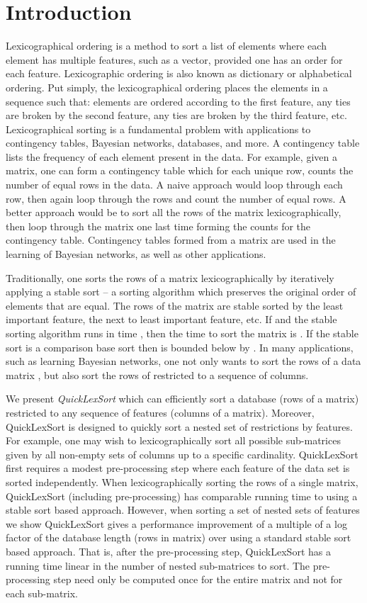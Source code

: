 \documentclass[a4paper,10pt,reqno]{amsart}
\theoremstyle{definition}
\begin{document}
\section{Introduction}
\label{sec:introduction}
Lexicographical ordering is a method to sort a list of elements where each
element has multiple features, such as a vector, provided one has an order for
each feature. Lexicographic ordering is also known as dictionary or
alphabetical ordering. Put simply, the lexicographical ordering places the
elements in a sequence such that: elements are ordered according to the first
feature, any ties are broken by the second feature, any ties are broken by the
third feature, etc. Lexicographical sorting is a fundamental problem with
applications to contingency tables, Bayesian networks,
databases\cite{poess2003data,lemire2010sorting}, and more. A contingency table
lists the frequency of each element present in the data. For example, given a
matrix, one can form a contingency table which for each unique row, counts the
number of equal rows in the data. A naive approach would loop through each row,
then again loop through the rows and count the number of equal rows. A better
approach would be to sort all the rows of the matrix lexicographically, then
loop through the matrix one last time forming the counts for the contingency
table. Contingency tables formed from a matrix are used in the learning of
Bayesian networks, as well as other applications.

Traditionally, one sorts the rows of a matrix lexicographically by iteratively
applying a stable sort -- a sorting algorithm which preserves the original
order of elements that are equal. The rows of the matrix  are stable sorted by
the least important feature, the next to least important feature, etc. If  and the stable sorting algorithm runs in time , then
the time to sort the matrix is . If the stable sort is a comparison
base sort then  is bounded below by
\cite{Cormen:2001fk}. In many applications, such as learning
Bayesian networks, one not only wants to sort the rows of a data matrix ,
but also sort the rows of  restricted to a sequence of columns. 


We present \emph{QuickLexSort} which can efficiently sort a database (rows of a
matrix) restricted to any sequence of features (columns of a matrix). Moreover,
QuickLexSort is designed to quickly sort a nested set of restrictions by
features. For example, one may wish to lexicographically sort all possible
sub-matrices given by all non-empty sets of columns up to a specific
cardinality. QuickLexSort first requires a modest pre-processing step where
each feature of the data set is sorted independently.  When lexicographically
sorting the rows of a single matrix, QuickLexSort (including pre-processing)
has comparable running time to using a stable sort based approach.  However,
when sorting a set of nested sets of features we show QuickLexSort gives a
performance improvement of a multiple of a log factor of the database length
(rows in matrix) over using a standard stable sort based approach. That is,
after the pre-processing step, QuickLexSort has a running time linear in the
number of nested sub-matrices to sort. The pre-processing step need only be
computed once for the entire matrix and not for each sub-matrix. 
\end{document}
